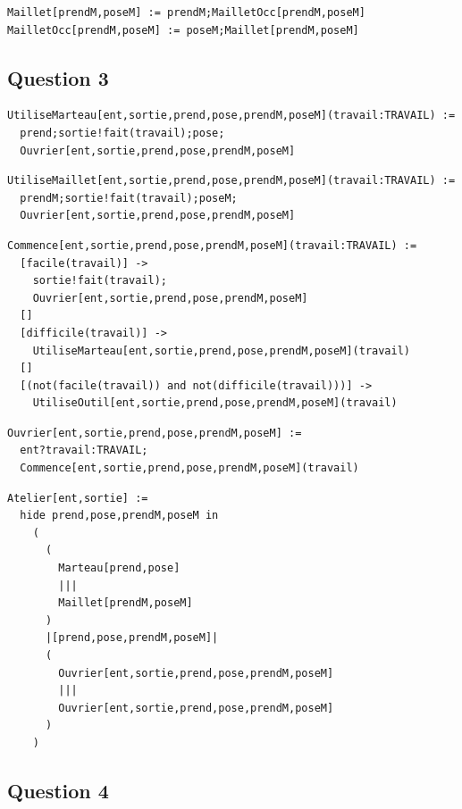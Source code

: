 \documentclass[a4paper,french,12pt]{article}
\begin{document}
\begin{verbatim}
Maillet[prendM,poseM] := prendM;MailletOcc[prendM,poseM]
MailletOcc[prendM,poseM] := poseM;Maillet[prendM,poseM]
\end{verbatim}

\subsection{Question 3}

\begin{verbatim}
UtiliseMarteau[ent,sortie,prend,pose,prendM,poseM](travail:TRAVAIL) :=
  prend;sortie!fait(travail);pose;
  Ouvrier[ent,sortie,prend,pose,prendM,poseM]
\end{verbatim}

\begin{verbatim}
UtiliseMaillet[ent,sortie,prend,pose,prendM,poseM](travail:TRAVAIL) :=
  prendM;sortie!fait(travail);poseM;
  Ouvrier[ent,sortie,prend,pose,prendM,poseM]
\end{verbatim}

\begin{verbatim}
Commence[ent,sortie,prend,pose,prendM,poseM](travail:TRAVAIL) :=
  [facile(travail)] ->
    sortie!fait(travail);
    Ouvrier[ent,sortie,prend,pose,prendM,poseM]
  []
  [difficile(travail)] ->
    UtiliseMarteau[ent,sortie,prend,pose,prendM,poseM](travail)
  []
  [(not(facile(travail)) and not(difficile(travail)))] ->
    UtiliseOutil[ent,sortie,prend,pose,prendM,poseM](travail)
\end{verbatim}

\begin{verbatim}
Ouvrier[ent,sortie,prend,pose,prendM,poseM] :=
  ent?travail:TRAVAIL;
  Commence[ent,sortie,prend,pose,prendM,poseM](travail)
\end{verbatim}

\begin{verbatim}
Atelier[ent,sortie] :=
  hide prend,pose,prendM,poseM in
    (
      (
        Marteau[prend,pose]
        |||
        Maillet[prendM,poseM]
      )
      |[prend,pose,prendM,poseM]|
      (
        Ouvrier[ent,sortie,prend,pose,prendM,poseM]
        |||
        Ouvrier[ent,sortie,prend,pose,prendM,poseM]
      )
    )
\end{verbatim}

\subsection{Question 4}
\end{document}
